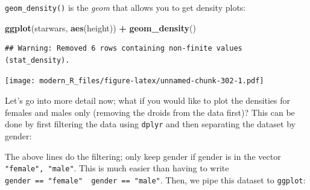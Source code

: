 \documentclass[]{gitbook}
\newenvironment{Shaded}{\begin{snugshade}}{\end{snugshade}}
\newcommand{\DataTypeTok}[1]{\textcolor[rgb]{0.13,0.29,0.53}{#1}}
\newcommand{\KeywordTok}[1]{\textcolor[rgb]{0.13,0.29,0.53}{\textbf{#1}}}
\newcommand{\NormalTok}[1]{#1}
\newcommand{\OperatorTok}[1]{\textcolor[rgb]{0.81,0.36,0.00}{\textbf{#1}}}
\newcommand{\StringTok}[1]{\textcolor[rgb]{0.31,0.60,0.02}{#1}}
\theoremstyle{definition}
\theoremstyle{definition}
\theoremstyle{definition}
\theoremstyle{remark}
\begin{document}
\texttt{geom\_density()} is the \emph{geom} that allows you to get
density plots:

\begin{Shaded}
\begin{Highlighting}[]
\KeywordTok{ggplot}\NormalTok{(starwars, }\KeywordTok{aes}\NormalTok{(height)) }\OperatorTok{+}
\StringTok{  }\KeywordTok{geom_density}\NormalTok{()}
\end{Highlighting}
\end{Shaded}

\begin{verbatim}
## Warning: Removed 6 rows containing non-finite values (stat_density).
\end{verbatim}

\texttt{[image: modern\_R\_files/figure-latex/unnamed-chunk-302-1.pdf]}

Let's go into more detail now; what if you would like to plot the
densities for females and males only (removing the droids from the data
first)? This can be done by first filtering the data using
\texttt{dplyr} and then separating the dataset by gender:

\begin{Shaded}
\end{Shaded}

The above lines do the filtering; only keep gender if gender is in the
vector \texttt{"female",\ "male"}. This is much easier than having to
write \texttt{gender\ ==\ "female"\ \textbar{}\ gender\ ==\ "male"}.
Then, we pipe this dataset to \texttt{ggplot}:

\begin{Shaded}
\end{Shaded}
\end{document}
